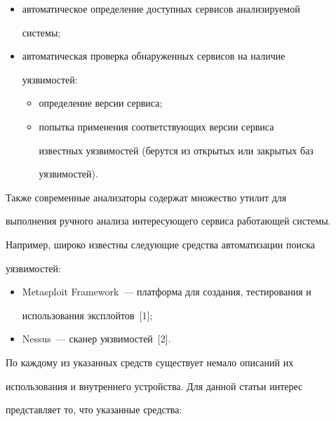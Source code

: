   \begin{itemize}


\item автоматическое определение доступных сервисов анализируемой 


системы;


\item автоматическая проверка обнаруженных сервисов на наличие 


уязвимостей:


\begin{itemize}


  \item определение версии сервиса;


  \item попытка применения соответствующих версии сервиса 


известных уязвимостей (берутся из открытых или закрытых баз 


уязвимостей).


  \end{itemize}


  \end{itemize}


  


  Также современные анализаторы содержат множество утилит для 


выполнения ручного анализа интересующего сервиса работающей системы. 


    Например, широко известны следующие средства автоматизации поиска 


уязвимостей:


  \begin{itemize}


  \item Metasploit Framework~--- платформа для создания, тестирования и 


использования эксплойтов~[1];


  \item Nessus~--- сканер уязвимостей~[2].


  \end{itemize}


  


  По каждому из указанных средств существует немало описаний их 


использования и внутреннего устройства. Для данной статьи интерес 


представляет то, что указанные средства: 



